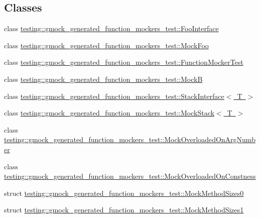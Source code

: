 \subsection*{Classes}
\begin{DoxyCompactItemize}
\item 
class \mbox{\hyperlink{classtesting_1_1gmock__generated__function__mockers__test_1_1FooInterface}{testing\+::gmock\+\_\+generated\+\_\+function\+\_\+mockers\+\_\+test\+::\+Foo\+Interface}}
\item 
class \mbox{\hyperlink{classtesting_1_1gmock__generated__function__mockers__test_1_1MockFoo}{testing\+::gmock\+\_\+generated\+\_\+function\+\_\+mockers\+\_\+test\+::\+Mock\+Foo}}
\item 
class \mbox{\hyperlink{classtesting_1_1gmock__generated__function__mockers__test_1_1FunctionMockerTest}{testing\+::gmock\+\_\+generated\+\_\+function\+\_\+mockers\+\_\+test\+::\+Function\+Mocker\+Test}}
\item 
class \mbox{\hyperlink{classtesting_1_1gmock__generated__function__mockers__test_1_1MockB}{testing\+::gmock\+\_\+generated\+\_\+function\+\_\+mockers\+\_\+test\+::\+MockB}}
\item 
class \mbox{\hyperlink{classtesting_1_1gmock__generated__function__mockers__test_1_1StackInterface}{testing\+::gmock\+\_\+generated\+\_\+function\+\_\+mockers\+\_\+test\+::\+Stack\+Interface$<$ T $>$}}
\item 
class \mbox{\hyperlink{classtesting_1_1gmock__generated__function__mockers__test_1_1MockStack}{testing\+::gmock\+\_\+generated\+\_\+function\+\_\+mockers\+\_\+test\+::\+Mock\+Stack$<$ T $>$}}
\item 
class \mbox{\hyperlink{classtesting_1_1gmock__generated__function__mockers__test_1_1MockOverloadedOnArgNumber}{testing\+::gmock\+\_\+generated\+\_\+function\+\_\+mockers\+\_\+test\+::\+Mock\+Overloaded\+On\+Arg\+Number}}
\item 
class \mbox{\hyperlink{classtesting_1_1gmock__generated__function__mockers__test_1_1MockOverloadedOnConstness}{testing\+::gmock\+\_\+generated\+\_\+function\+\_\+mockers\+\_\+test\+::\+Mock\+Overloaded\+On\+Constness}}
\item 
struct \mbox{\hyperlink{structtesting_1_1gmock__generated__function__mockers__test_1_1MockMethodSizes0}{testing\+::gmock\+\_\+generated\+\_\+function\+\_\+mockers\+\_\+test\+::\+Mock\+Method\+Sizes0}}
\item 
struct \mbox{\hyperlink{structtesting_1_1gmock__generated__function__mockers__test_1_1MockMethodSizes1}{testing\+::gmock\+\_\+generated\+\_\+function\+\_\+mockers\+\_\+test\+::\+Mock\+Method\+Sizes1}}

\end{DoxyCompactItemize}
